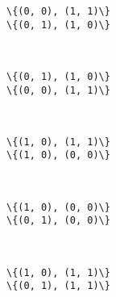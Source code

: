 \documentclass[11pt]{article}
\begin{document}
    \begin{Verbatim}[commandchars=\\\{\}]
\{(0, 0), (1, 1)\}
\{(0, 1), (1, 0)\}

    \end{Verbatim}

    \begin{center}
    \end{center}
    { \hspace*{\fill} \\}
    
    \begin{Verbatim}[commandchars=\\\{\}]
\{(0, 1), (1, 0)\}
\{(0, 0), (1, 1)\}

    \end{Verbatim}

    \begin{center}
    \end{center}
    { \hspace*{\fill} \\}
    
    \begin{Verbatim}[commandchars=\\\{\}]
\{(1, 0), (1, 1)\}
\{(1, 0), (0, 0)\}

    \end{Verbatim}

    \begin{center}
    \end{center}
    { \hspace*{\fill} \\}
    
    \begin{Verbatim}[commandchars=\\\{\}]
\{(1, 0), (0, 0)\}
\{(0, 1), (0, 0)\}

    \end{Verbatim}

    \begin{center}
    \end{center}
    { \hspace*{\fill} \\}
    
    \begin{Verbatim}[commandchars=\\\{\}]
\{(1, 0), (1, 1)\}
\{(0, 1), (1, 1)\}

    \end{Verbatim}
\end{document}
